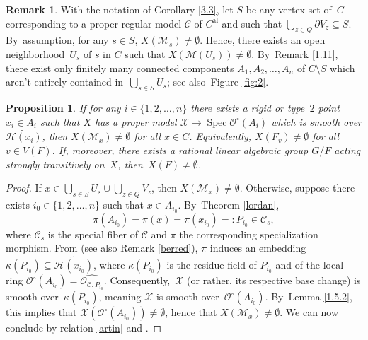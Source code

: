 \documentclass[JEP,XML,SOM,Unicode,NoFloatCountersInSection,published]{cedram}
\newcommand{\al}{\mathrm{al}}
\DeclareMathOperator{\Spec}{Spec}
\let\backslash\setminus
\newtheorem{prop}[thm]{Proposition}
\theoremstyle{definition}
\newtheorem{rem}[thm]{Remark}
\begin{document}
\begin{rem} \label{3.3.2}
With the notation of Corollary \ref{3.3}, let $S$ be any vertex set of~$C$ corresponding to a proper regular model $\mathscr{C}$ of $C^{\al}$ and such that $\bigcup_{z \in Q} \partial{V_z} \subseteq S$. By~assumption, for any $s \in S$, $X(\mathscr{M}_s) \neq \emptyset$. Hence, there exists an open neighborhood~$U_s$ of $s$ in $C$ such that $X(\mathscr{M}(U_s)) \neq \emptyset$. By~Remark \ref{1.11}, there exist only finitely many connected components $A_1, A_2, \dots, A_n$ of $C \backslash S$ which aren't entirely contained in~${\bigcup_{s \in S} U_s}$; see also~Figure \ref{fig:2}.

\begin{prop} \label{3.3.3}
If for any $i \!\in\! \{1, 2, \dots, n\}$ there exists a rigid or type~$2$ point \hbox{$x_i \!\in\! A_i$} such that $X$ has a proper model $\mathcal{X} \to \Spec \mathcal{O}^{\circ}(A_i)$ which is smooth over $\widetilde{\mathcal{H}(x_i)}$, then $X(\mathscr{M}_x) \neq \emptyset$ for all $x \in C$. Equivalently, $X(F_v) \neq \emptyset$ for all $v \in V(F)$.
If, moreover, there exists a rational linear algebraic group $G/F$ acting strongly transitively on~$X$, then~${X(F) \neq \emptyset}$.
\end{prop}

\begin{proof}
If $x \in \bigcup_{s \in S} U_s \cup \bigcup_{z \in Q} V_z$, then $X(\mathscr{M}_x) \neq \emptyset$. Otherwise, suppose there exists $i_0 \in \{1,2,\dots, n\}$ such that $x \in A_{i_0}$. By~Theorem \ref{lordan},
\[
\pi(A_{i_0})=\pi(x)=\pi(x_{i_0})=:P_{i_0} \in \mathscr{C}_s,
\]
where $\mathscr{C}_s$ is the special fiber of $\mathscr{C}$ and $\pi$ the corresponding specialization morphism.
From \cite[2.4, p.\,35]{Ber90} (see also Remark \ref{berred}), $\pi$ induces an embedding $\kappa(P_{i_0}) \subseteq \widetilde{\mathcal{H}(x_{i_0})}$, where $\kappa(P_{i_0})$ is the residue field of $P_{i_0}$ and of the local ring $\mathcal{O}^{\circ}(A_{i_0})=\widehat{\mathcal{O}_{\mathscr{C}, P_{i_0}}}$. Consequently,~$\mathcal{X}$ (or rather, its respective base change) is smooth over~$\kappa(P_{i_0})$, meaning $\mathcal{X}$ is smooth over~$\mathcal{O}^{\circ}(A_{i_0})$. By~Lemma \ref{1.5.2}, this implies that ${\mathcal{X}(\mathcal{O}^{\circ}(A_{i_0})) \neq \emptyset}$, hence that $X(\mathscr{M}_x) \neq \emptyset$. We can now conclude by relation \eqref{artin} and \cite[Cor.\,3.18]{une}.
\end{proof}
\end{rem}
\end{document}
